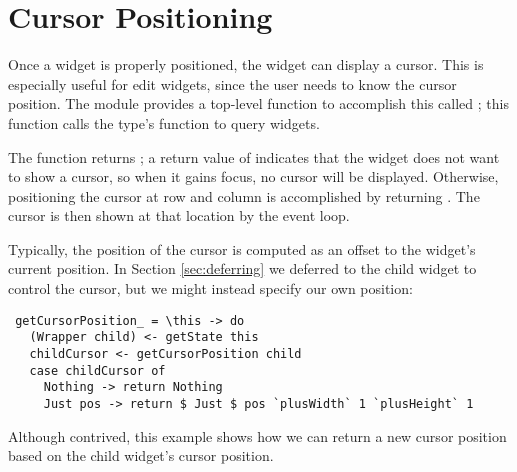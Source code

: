 \section{Cursor Positioning}

Once a widget is properly positioned, the widget can display a cursor.
This is especially useful for edit widgets, since the user needs to
know the cursor position.  The  module provides a top-level
function to accomplish this called ; this
function calls the  type's 
function to query widgets.

The  function returns ; a return value of  indicates that the
widget does not want to show a cursor, so when it gains focus, no
cursor will be displayed.  Otherwise, positioning the cursor at row
 and column  is accomplished by returning .  The cursor is then shown at that location by
the event loop.

Typically, the position of the cursor is computed as an offset to the
widget's current position.  In Section \ref{sec:deferring} we deferred
to the child widget to control the cursor, but we might instead
specify our own position:

\begin{verbatim}
 getCursorPosition_ = \this -> do
   (Wrapper child) <- getState this
   childCursor <- getCursorPosition child
   case childCursor of
     Nothing -> return Nothing
     Just pos -> return $ Just $ pos `plusWidth` 1 `plusHeight` 1
\end{verbatim}

Although contrived, this example shows how we can return a new cursor
position based on the child widget's cursor position.
